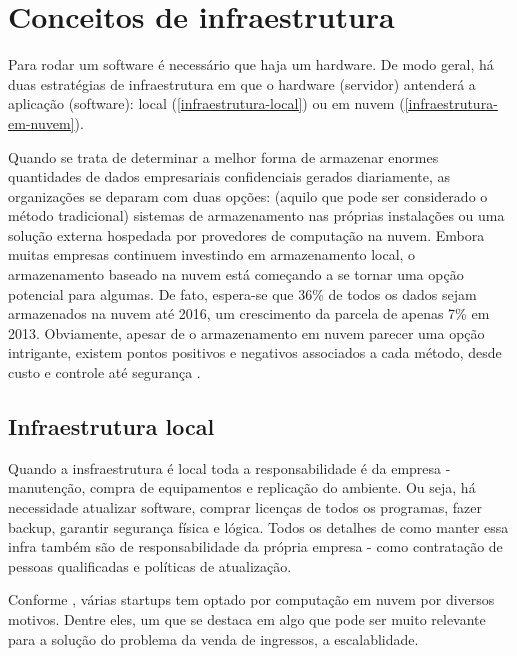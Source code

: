 \chapter{Conceitos de infraestrutura}

Para rodar um software é necessário que haja um hardware. De modo geral,
há duas estratégias de infraestrutura em que o hardware (servidor) antenderá a aplicação (software):
local (\autoref{infraestrutura-local}) ou em nuvem (\autoref{infraestrutura-em-nuvem}).

\begin{citacao}

Quando se trata de determinar a melhor forma de armazenar enormes quantidades de
dados empresariais confidenciais gerados diariamente, as organizações se deparam
com duas opções: (aquilo que pode ser considerado o método tradicional) sistemas
de armazenamento nas próprias instalações ou uma solução externa hospedada por
provedores de computação na nuvem. Embora muitas empresas continuem investindo
em armazenamento local, o armazenamento baseado na nuvem está começando a se
tornar uma opção potencial para algumas. De fato, espera-se que 36\% de todos
os dados sejam armazenados na nuvem até 2016, um crescimento da parcela de
apenas 7\% em 2013. Obviamente, apesar de o armazenamento em nuvem parecer
uma opção intrigante, existem pontos positivos e negativos associados a cada
método, desde custo e controle até segurança \cite{armazenamento-no-local-ou-na-nuvem}.

\end{citacao}

\section{Infraestrutura local}\label{infraestrutura-local}

Quando a insfraestrutura é local toda a responsabilidade é da empresa - manutenção,
compra de equipamentos e replicação do ambiente.
Ou seja, há necessidade atualizar software, comprar licenças de todos os programas,
fazer backup, garantir segurança física e lógica.
Todos os detalhes de como manter essa infra também são de responsabilidade da própria empresa -
como contratação de pessoas qualificadas e políticas de atualização.

Conforme \cite{beneficios-da-computacao-em-nuvem-para-sua-startup}, várias startups
tem optado por computação em nuvem por diversos motivos. Dentre eles, um que se destaca
em algo que pode ser muito relevante para a solução do problema da venda de ingressos, 
a escalablidade.

